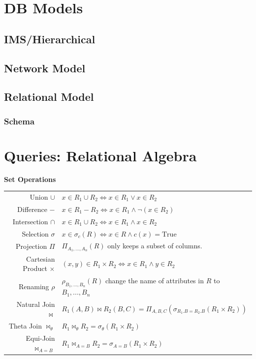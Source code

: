 \documentclass{sciposter}
\newenvironment{method}[1]{\begin{mdframed}[backgroundcolor=blue!10,innertopmargin=15pt, innerbottommargin=15pt, nobreak=true]
		\textbf{#1 }
	}
	{ 
	\end{mdframed}
}
\begin{document}
\begin{multicols}{3}
\section{DB Models}
\subsection{IMS/Hierarchical}
\subsection{Network Model}
\subsection{Relational Model}
\subsubsection{Schema}
\section{Queries: Relational Algebra}
\begin{method}{Set Operations}\\
\begin{tabularx}{\columnwidth}{r|X}
Union $\cup$ & $x \in R_1 \cup R_2 \iff x \in R_1 \lor x \in R_2$\\
Difference $-$ & $x \in R_1 - R_2 \iff x \in R_1 \land \lnot (x \in R_2)$\\
Intersection $\cap$ & $x \in R_1 \cup R_2 \iff x \in R_1 \land x \in R_2$\\
Selection $\sigma$ & $x \in \sigma_c(R) \iff x \in R \land c(x) = \text{True}$\\
Projection $\Pi$ & $\Pi_{A_1,...,A_n}(R)$ only keeps a subset of columns.\\
Cartesian Product $\times$ & $(x, y) \in R_1 \times R_2 \iff x \in R_1 \land y \in R_2$\\
Renaming $\rho$ & $\rho_{B_1,...,B_n}(R)$ change the name of attributes in $R$ to $B_1, ..., B_n$\\
Natural Join $\bowtie$ & $R_1(A, B) \bowtie R_2(B, C) = \Pi_{A, B, C}(\sigma_{R_1.B=R_2.B}(R_1 \times R_2))$\\
Theta Join $\bowtie_\theta$ & $R_1 \bowtie_\theta R_2 = \sigma_\theta(R_1 \times R_2)$\\
Equi-Join $\bowtie_{A=B}$ & $R_1 \bowtie_{A=B} R_2 = \sigma_{A=B}(R_1 \times R_2)$
\end{tabularx}
\end{method}
\begin{mdframed}

\end{mdframed}
\end{multicols}
\end{document}
